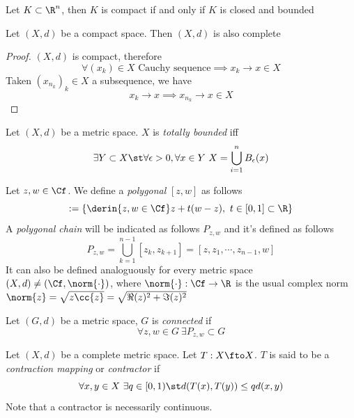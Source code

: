 \documentclass[../mmf.tex]{subfiles}
\begin{document}
\begin{thm}
	Let $K\subset\R^n$, then $K$ is compact if and only if $K$ is closed and bounded
\end{thm}
\begin{thm}
	Let $(X,d)$ be a compact space. Then $(X,d)$ is also complete
\end{thm}
\begin{proof}
	$(X,d)$ is compact, therefore
	\begin{equation*}
		\forall(x_k)\in X\text{ Cauchy sequence}\implies{} x_k\to x\in X
	\end{equation*}
	Taken $(x_{n_k})_k\in X$ a subsequence, we have
	\begin{equation*}
		x_{k}\to x\implies{} x_{n_k}\to x\in X
	\end{equation*}
\end{proof}
\begin{dfn}
	Let $(X,d)$ be a metric space. $X$ is \textit{totally bounded} iff
	\begin{equation*}
		\exists Y\subset X\st\forall\epsilon>0,\forall x\in Y\ X=\bigcup_{i=1}^nB_\epsilon(x)
	\end{equation*}
\end{dfn}
\begin{dfn}
	Let $z,w\in\Cf$. We define a \textit{polygonal} $[z,w]$ as follows
	\begin{equation*}
		[z,w]:=\{\derin{z,w\in\Cf}z+t(w-z),\ t\in[0,1]\subset\R\}
	\end{equation*}
	A \textit{polygonal chain} will be indicated as follows $P_{z,w}$ and it's defined as follows
	\begin{equation*}
		P_{z,w}=\bigcup_{k=1}^{n-1}[z_k,z_{k+1}]=[z,z_1,\cdots,z_{n-1},w]
	\end{equation*}
	It can also be defined analoguously for every metric space $(X,d)\ne(\Cf,\norm{\cdot})$, where $\norm{\cdot}:\Cf\to\R$ is the usual complex norm $\norm{z}=\sqrt{z\cc{z}}=\sqrt{\Re(z)^2+\Im(z)^2}$
\end{dfn}
\begin{dfn}
	Let $(G,d)$ be a metric space, $G$ is \textit{connected} if
	\begin{equation*}
		\forall z,w\in G\ \exists P_{z,w}\subset G
	\end{equation*}
\end{dfn}
\begin{dfn}
	Let $(X,d)$ be a complete metric space. Let $T:X\fto X$. $T$ is said to be a \textit{contraction mapping} or \textit{contractor} if
	\begin{equation}
		\forall x,y\in X\ \exists q\in[0,1)\st d(T(x),T(y))\le qd(x,y)
		\label{eq:contractor}
	\end{equation}
	Note that a contractor is necessarily continuous.
\end{dfn}
\end{document}
